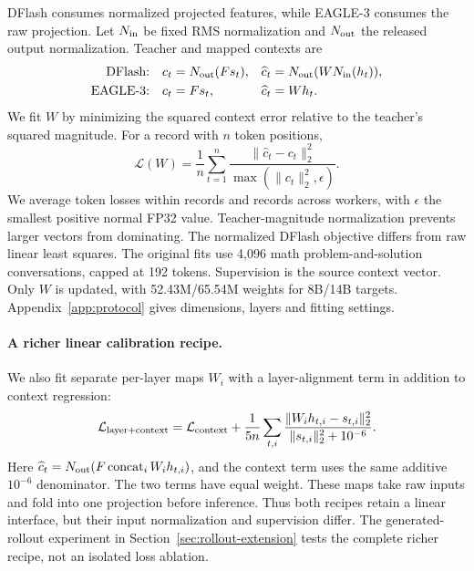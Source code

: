 \documentclass{article}
\begin{document}
DFlash consumes normalized projected features, while EAGLE-3 consumes
the raw projection. Let $N_{\rm in}$ be fixed RMS normalization
\citep{zhang2019rmsnorm} and $N_{\rm out}$ the released output normalization.
Teacher and mapped contexts are
\begin{equation}
\begin{aligned}
\text{DFlash:}\quad c_t&=N_{\rm out}(Fs_t), &
\widehat c_t&=N_{\rm out}(WN_{\rm in}(h_t)),\\
\text{EAGLE-3:}\quad c_t&=Fs_t, &\widehat c_t&=Wh_t.
\end{aligned}
\label{eq:interfaces}
\end{equation}
We fit $W$ by minimizing the squared context error relative to the teacher's
squared magnitude. For a record with $n$ token positions,
\begin{equation}
\mathcal L(W)=\frac1n\sum_{t=1}^{n}
\frac{\|\widehat c_t-c_t\|_2^2}{\max(\|c_t\|_2^2,\epsilon)}.
\label{eq:loss}
\end{equation}
We average token losses within records and records across workers,
with $\epsilon$ the smallest positive normal FP32 value. Teacher-magnitude
normalization prevents larger vectors from dominating. The normalized
DFlash objective differs from raw linear least squares.
The original fits use 4,096 math problem-and-solution conversations,
capped at 192 tokens. Supervision is the source context vector.
Only $W$ is updated, with 52.43M/65.54M weights for 8B/14B targets.
Appendix~\ref{app:protocol} gives dimensions, layers and fitting settings.

\paragraph{A richer linear calibration recipe.}
We also fit separate per-layer maps $W_i$ with a layer-alignment term
in addition to context regression:
\begin{equation}
\mathcal L_{\rm layer+context}
=\mathcal L_{\rm context}
+\frac{1}{5n}\sum_{t,i}
\frac{\|W_i h_{t,i}-s_{t,i}\|_2^2}{\|s_{t,i}\|_2^2+10^{-6}}.
\label{eq:layer-context}
\end{equation}
Here $\widehat c_t=N_{\rm out}(F\operatorname{concat}_i W_i h_{t,i})$,
and the context term uses the same additive $10^{-6}$ denominator.
The two terms have equal weight. These maps take raw inputs and fold
into one projection before inference. Thus both recipes retain a linear
interface, but their input normalization and supervision differ.
The generated-rollout experiment in Section~\ref{sec:rollout-extension}
tests the complete richer recipe, not an isolated loss ablation.
\end{document}
